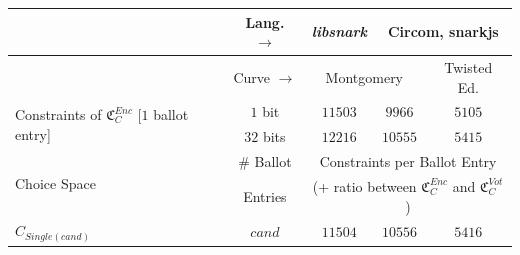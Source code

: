 \begin{table}[h]
    \centering
    \renewcommand{\arraystretch}{1.3}
    \begin{tabular}{|l|c|cccccc|}
        \hline
                                                                                                                                                      & Lang. $\to$                                & \multicolumn{2}{c|}{\textit{libsnark}}                           & \multicolumn{4}{c|}{Circom, snarkjs}                                      \\ \hline
                                                                                                                                                      & Curve $\to$                                & \multicolumn{4}{c|}{Montgomery}                                                                           & \multicolumn{2}{c|}{Twisted Ed.} \\ \hline
        \multirow{2}{*}{Constraints of $\mathfrak{C}_C^{Enc}$ [$1$ ballot entry]}                                                                     & \multicolumn{1}{c|}{$1$ bit}               & \multicolumn{2}{c|}{$11503$}                                     & \multicolumn{2}{c|}{$9966$}            & \multicolumn{2}{c|}{$5105$}      \\
                                                                                                                                                      & \multicolumn{1}{c|}{$32$ bits}             & \multicolumn{2}{c|}{$12216$}                                     & \multicolumn{2}{c|}{$10555$}           & \multicolumn{2}{c|}{$5415$}      \\ \hline
        \multirow{2}{*}{Choice Space}                                                                                                                 & \# Ballot                                  & \multicolumn{6}{c|}{Constraints per Ballot Entry}                                                                         \\
                                                                                                                                                      & Entries                                    & \multicolumn{6}{c|}{(+ ratio between $\mathfrak{C}_C^{Enc}$ and $\mathfrak{C}_C^{Vot}$)}                                                                                                                        \\ \hline\hline
        \multirow{2}{*}{$C_{Single(cand)}$}                                                                                                           & \multirow{14}{*}{$cand$}                   & \multicolumn{2}{c|}{$11504$}                                     & \multicolumn{2}{c|}{$10556$}           & \multicolumn{2}{c|}{$5416$}      \\

\end{tabular}
\end{table}
